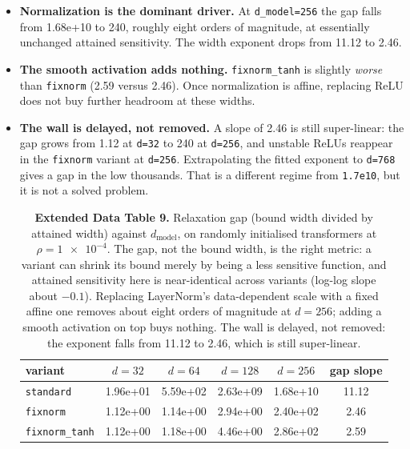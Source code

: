 \documentclass[sn-nature,pdflatex]{sn-jnl}
\begin{document}
\begin{itemize}
\item \textbf{Normalization is the dominant driver.} At \texttt{d\_model=256} the gap falls from 1.68e+10 to 240, roughly eight orders of magnitude, at essentially unchanged attained sensitivity. The width exponent drops from 11.12 to 2.46.
\item \textbf{The smooth activation adds nothing.} \texttt{fixnorm\_tanh} is slightly \emph{worse} than \texttt{fixnorm} (2.59 versus 2.46). Once normalization is affine, replacing ReLU does not buy further headroom at these widths.
\item \textbf{The wall is delayed, not removed.} A slope of 2.46 is still super-linear: the gap grows from 1.12 at \texttt{d=32} to 240 at \texttt{d=256}, and unstable ReLUs reappear in the \texttt{fixnorm} variant at \texttt{d=256}. Extrapolating the fitted exponent to \texttt{d=768} gives a gap in the low thousands. That is a different regime from \texttt{1.7e10}, but it is not a solved problem.

\begin{table}[t]
\centering
\caption*{\textbf{Extended Data Table 9.} Relaxation gap (bound width divided by attained width) against $d_{\text{model}}$, on randomly initialised transformers at $\rho=\num{1e-4}$. The gap, not the bound width, is the right metric: a variant can shrink its bound merely by being a less sensitive function, and attained sensitivity here is near-identical across variants (log-log slope about $-0.1$). Replacing LayerNorm's data-dependent scale with a fixed affine one removes about eight orders of magnitude at $d=256$; adding a smooth activation on top buys nothing. The wall is delayed, not removed: the exponent falls from 11.12 to 2.46, which is still super-linear.}
\label{edtab:variants}
\begin{tabular}{l S[table-format=1.2e2] S[table-format=1.2e2] S[table-format=1.2e2] S[table-format=1.2e2] S[table-format=2.2]}
\toprule
variant & {$d{=}32$} & {$d{=}64$} & {$d{=}128$} & {$d{=}256$} & {gap slope} \\
\midrule
\texttt{standard} & 1.96e+01 & 5.59e+02 & 2.63e+09 & 1.68e+10 & 11.12 \\
\texttt{fixnorm} & 1.12e+00 & 1.14e+00 & 2.94e+00 & 2.40e+02 & 2.46 \\
\texttt{fixnorm\_tanh} & 1.12e+00 & 1.18e+00 & 4.46e+00 & 2.86e+02 & 2.59 \\
\bottomrule
\end{tabular}
\end{table}

\end{itemize}
\end{document}
